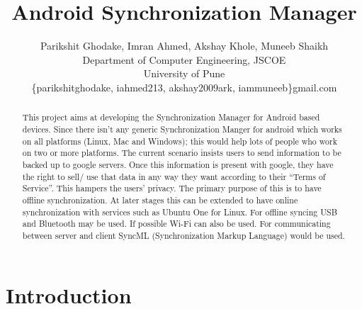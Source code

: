 \documentclass[%
	final,
	notitlepage,
	narroweqnarray,
	inline,
	twoside,
	]{ieee}
\begin{document}
\title{Android Synchronization Manager}

\author{Parikshit Ghodake, Imran Ahmed, Akshay Khole, Muneeb Shaikh \\
Department of Computer Engineering, JSCOE \\
University of Pune\\
\{parikshitghodake, iahmed213, akshay2009ark, iammuneeb\}gmail.com
}

\maketitle               

\begin{abstract} 
This project aims at developing the Synchronization Manager for Android based 
devices. Since there isn't any generic Synchronization Manger for android which 
works on all platforms (Linux, Mac and Windows); this would help lots of people who 
work on two or more platforms. 
The current scenario insists users to send information to be backed up to google 
servers. Once this information is present with google, they have the right to sell/
use that data in any way they want according to their “Terms of Service”. This 
hampers the users’ privacy. The primary purpose of this is to have offline 
synchronization. At later stages  this can be extended to have online 
synchronization with services such as Ubuntu One for Linux. For offline syncing USB 
and Bluetooth may be used. If possible Wi-Fi can also be used. For communicating 
between server and client SyncML (Synchronization Markup Language) would be used.
\end{abstract}


\section{Introduction}
\end{document}
